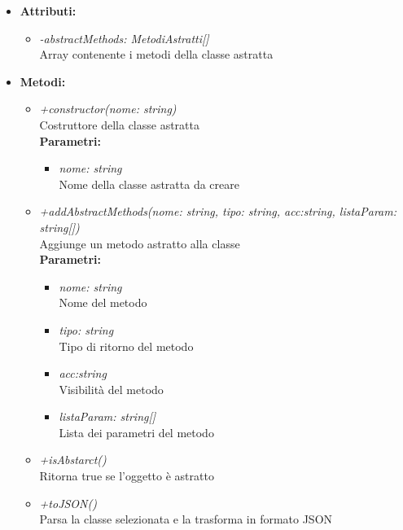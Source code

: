 \begin{itemize}
	\item \textbf{Attributi:}
		\begin{itemize}
			\item \emph{-abstractMethods: MetodiAstratti[]}\\
			Array contenente i metodi della classe astratta
		\end{itemize}
	\item \textbf{Metodi:}
		\begin{itemize}
			\item \emph{+constructor(nome: string)}\\
    		Costruttore della classe astratta\\
    		\textbf{Parametri:}
    		\begin{itemize}
    			\item \emph{nome: string}\\
    			Nome della classe astratta da creare
    		\end{itemize}
    		\item \emph{+addAbstractMethods(nome: string, tipo: string, acc:string, listaParam: string[])}\\
    		Aggiunge un metodo astratto alla classe\\
    		\textbf{Parametri:}
    		\begin{itemize}
    			\item \emph{nome: string}\\
    			Nome del metodo
    			\item \emph{tipo: string}\\
    			Tipo di ritorno del metodo
    			\item \emph{acc:string}\\
    			Visibilità del metodo
    			\item \emph{listaParam: string[]}\\
    			Lista dei parametri del metodo
    		\end{itemize}
    		\item \emph{+isAbstarct()}\\
    		Ritorna true se l'oggetto è astratto
    		\item \emph{+toJSON()}\\
    		Parsa la classe selezionata e la trasforma in formato JSON
    	\end{itemize}
\end{itemize}